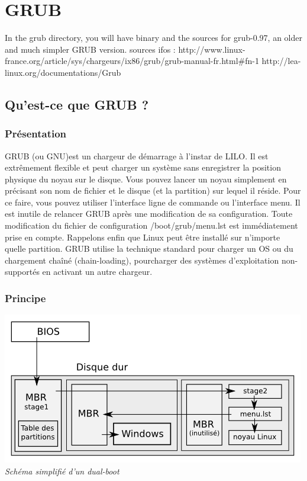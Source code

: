 \documentclass[10]{article}
\begin{document}
\section{GRUB} 

In the grub directory, you will have binary and the sources for
grub-0.97, an older and much simpler GRUB version.
sources ifos :
http://www.linux-france.org/article/sys/chargeurs/ix86/grub/grub-manual-fr.html\#fn-1
http://lea-linux.org/documentations/Grub

\subsection{Qu'est-ce que GRUB ?}
\subsubsection{Présentation}
GRUB (ou GNU)est un chargeur de d\'emarrage \`a  l'instar de LILO. Il est extr\^emement flexible et peut charger un syst\`eme sans enregistrer la position physique du noyau sur le disque. Vous pouvez lancer un noyau simplement en pr\'ecisant son nom de fichier et le disque (et la partition) sur lequel il r\'eside. Pour ce faire, vous pouvez utiliser l'interface ligne de commande ou l'interface menu. Il est inutile de relancer GRUB apr\`es une modification de sa configuration. Toute modification du fichier de configuration /boot/grub/menu.lst est imm\'ediatement prise en compte. Rappelons enfin que Linux peut être install\'e sur n'importe quelle partition. 
GRUB utilise la technique standard pour charger un OS ou du chargement chaîn\'e (chain-loading), pourcharger des syst\`emes d'exploitation non-support\'es en activant un autre chargeur.
\subsubsection{Principe}
\includegraphics{SchemaSimplifieGrubDualBoot}\\
\textit{Sch\'ema simplifi\'e d'un dual-boot}
\end{document}

